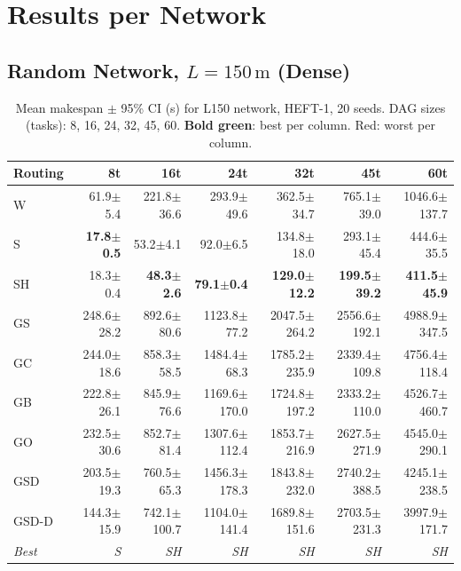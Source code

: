 \documentclass[11pt]{article}
\newcommand{\win}[1]{\textcolor{green!50!black}{\textbf{#1}}}
\newcommand{\bad}[1]{\textcolor{red!70!black}{#1}}
\begin{document}
\section{Results per Network}

\subsection{Random Network, $L=150\,\mathrm{m}$ (Dense)}

\begin{table}[H]
\centering
\small
\setlength{\tabcolsep}{4pt}
\begin{tabular}{l  r r r r r r}
\toprule
\textbf{Routing} & \textbf{8t} & \textbf{16t} & \textbf{24t} & \textbf{32t} & \textbf{45t} & \textbf{60t} \\
\midrule
  W & 61.9$\pm$5.4 & 221.8$\pm$36.6 & 293.9$\pm$49.6 & 362.5$\pm$34.7 & 765.1$\pm$39.0 & 1046.6$\pm$137.7 \\
  S & \win{17.8$\pm$0.5} & 53.2$\pm$4.1 & 92.0$\pm$6.5 & 134.8$\pm$18.0 & 293.1$\pm$45.4 & 444.6$\pm$35.5 \\
  SH & 18.3$\pm$0.4 & \win{48.3$\pm$2.6} & \win{79.1$\pm$0.4} & \win{129.0$\pm$12.2} & \win{199.5$\pm$39.2} & \win{411.5$\pm$45.9} \\
  GS & \bad{248.6$\pm$28.2} & \bad{892.6$\pm$80.6} & 1123.8$\pm$77.2 & \bad{2047.5$\pm$264.2} & 2556.6$\pm$192.1 & \bad{4988.9$\pm$347.5} \\
  GC & 244.0$\pm$18.6 & 858.3$\pm$58.5 & \bad{1484.4$\pm$68.3} & 1785.2$\pm$235.9 & 2339.4$\pm$109.8 & 4756.4$\pm$118.4 \\
  GB & 222.8$\pm$26.1 & 845.9$\pm$76.6 & 1169.6$\pm$170.0 & 1724.8$\pm$197.2 & 2333.2$\pm$110.0 & 4526.7$\pm$460.7 \\
  GO & 232.5$\pm$30.6 & 852.7$\pm$81.4 & 1307.6$\pm$112.4 & 1853.7$\pm$216.9 & 2627.5$\pm$271.9 & 4545.0$\pm$290.1 \\
  GSD & 203.5$\pm$19.3 & 760.5$\pm$65.3 & 1456.3$\pm$178.3 & 1843.8$\pm$232.0 & \bad{2740.2$\pm$388.5} & 4245.1$\pm$238.5 \\
  GSD\mbox{-}D & 144.3$\pm$15.9 & 742.1$\pm$100.7 & 1104.0$\pm$141.4 & 1689.8$\pm$151.6 & 2703.5$\pm$231.3 & 3997.9$\pm$171.7 \\
\midrule
  \textit{Best} & \textit{S} & \textit{SH} & \textit{SH} & \textit{SH} & \textit{SH} & \textit{SH} \\
\bottomrule
\end{tabular}
\caption{Mean makespan $\pm$ 95\% CI (s) for L150 network, HEFT-1, 20 seeds. DAG sizes (tasks): 8, 16, 24, 32, 45, 60. \win{Bold green}: best per column. \bad{Red}: worst per column.}
\end{table}
\end{document}

